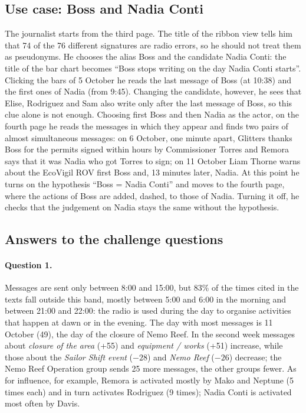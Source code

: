 \documentclass[11pt,a4paper]{article}
\begin{document}
\subsection{Use case: Boss and Nadia Conti}
The journalist starts from the third page. The title of the ribbon view tells him that 74 of the 76 different
signatures are radio errors, so he should not treat them as pseudonyms. He chooses the alias Boss and the candidate
Nadia Conti: the title of the bar chart becomes ``Boss stops writing on the day Nadia Conti starts''. Clicking the bars
of 5 October he reads the last message of Boss (at 10:38) and the first ones of Nadia (from 9:45). Changing the
candidate, however, he sees that Elise, Rodriguez and Sam also write only after the last message of Boss, so this clue
alone is not enough. Choosing first Boss and then Nadia as the actor, on the fourth page he reads the messages in which they appear and
finds two pairs of almost simultaneous messages: on 6 October,
one minute apart, Glitters thanks Boss for the permits signed within hours by Commissioner Torres and Remora says that
it was Nadia who got Torres to sign; on 11 October Liam Thorne warns about the EcoVigil ROV first Boss and, 13 minutes
later, Nadia. At this point he turns on the hypothesis ``Boss = Nadia Conti'' and moves to the fourth page, where the
actions of Boss are added, dashed, to those of Nadia. Turning it off, he checks that the judgement on Nadia stays the
same without the hypothesis.

\subsection{Answers to the challenge questions}\label{sec:answers}
\paragraph{Question 1.} Messages are sent only between 8:00 and 15:00, but 83\% of the times cited in the texts fall
outside this band, mostly between 5:00 and 6:00 in the morning and between 21:00 and 22:00: the radio is used during the
day to organise activities that happen at dawn or in the evening. The day with most messages is 11 October (49), the
day of the closure of Nemo Reef. In the second week messages about \emph{closure of the area} (+55) and
\emph{equipment / works} (+51) increase, while those about the \emph{Sailor Shift event} ($-28$) and \emph{Nemo Reef}
($-26$) decrease; the Nemo Reef Operation group sends 25 more messages, the other groups fewer. As for influence, for
example, Remora is activated mostly by Mako and Neptune (5 times each) and in turn activates Rodriguez (9 times); Nadia Conti is
activated most often by Davis.
\end{document}
